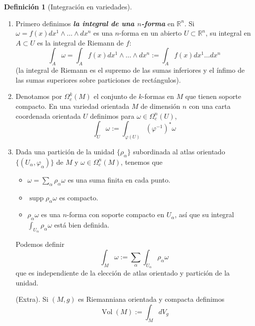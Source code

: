 \documentclass[spanish]{article}
\theoremstyle{definition}
\newtheorem*{defn}{Definición}
\newcommand{\R}{\mathbb{R}}
\DeclareMathOperator{\supp}{supp}
\begin{document}
	\begin{defn}[Integración en variedades]\leavevmode
		\begin{enumerate}
			\item Primero definimos \textit{\textbf{la integral de una $n$-forma}} en $\R^n$. Si $\omega=f(x)dx^1\wedge\ldots\wedge dx^n$ es una $n$-forma en un abierto $U\subset\R^n$, su integral en $A\subset U$ es la integral de Riemann de $f$:
			\[\int_A\omega=\int_Af(x)dx^1\wedge\ldots\wedge dx^n:=\int_Af(x)dx^1\ldots dx^n\]
			(la integral de Riemann es el supremo de las sumas inferiores y el ínfimo de las sumas superiores sobre particiones de rectángulos).
			
			\item Denotamos por $\Omega_c^k(M)$ el conjunto de $k$-formas en $M$ que tienen soporte compacto. En una variedad orientada $M$ de dimensión $n$ con una carta coordenada orientada $U$ definimos para $\omega\in\Omega_c^n(U)$,
			\[\int_U\omega:=\int_{\varphi(U)}(\varphi^{-1})^*\omega\]
			\item Dada una partición de la unidad $\{\rho_\alpha\}$ subordinada al atlas orientado $\{(U_\alpha,\varphi_\alpha)\}$ de $M$ y $\omega\in\Omega_c^n(M)$, tenemos que
			\begin{itemize}
				\item $\omega=\sum_\alpha\rho_\alpha\omega$ es una suma finita en cada punto.
				\item $\supp \rho_\alpha\omega$ es compacto.
				\item $\rho_\alpha\omega$ es una $n$-forma con soporte compacto en $U_\alpha$, así que su integral $\int_{U_\alpha}\rho_\alpha\omega$ está bien definida.
			\end{itemize}
			Podemos definir
			\[\int_M\omega:=\sum_\alpha\int_{U_\alpha}\rho_\alpha\omega\]
			que es independiente de la elección de atlas orientado y partición de la unidad.
			
			(Extra). Si $(M,g)$ es Riemanniana orientada y compacta definimos
			\[\operatorname{Vol}(M):=\int_MdV_g\]
		\end{enumerate}
	\end{defn}
	
\end{document}
